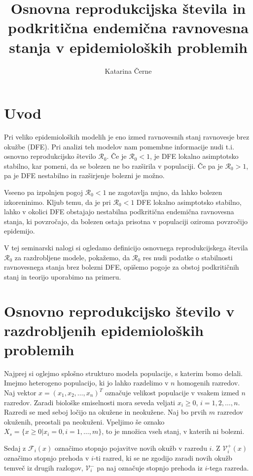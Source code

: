 \documentclass[a4paper,12pt]{article}
\newcommand{\R}{\mathcal R}
\newcommand{\F}{\mathcal F}
\newcommand{\V}{\mathcal V}
\begin{document}
\title{Osnovna reprodukcijska števila in podkritična endemična ravnovesna stanja v epidemioloških problemih}
\author{Katarina Černe}
\maketitle

\section{Uvod}

Pri veliko epidemioloških modelih je eno izmed ravnovesnih stanj ravnovesje brez okužbe (DFE). 
Pri analizi teh modelov nam pomembne informacije nudi t.i. osnovno reprodukcijsko 
število \(\R_0\). Če je \(\R_0<1\), je DFE lokalno asimptotsko stabilno, kar pomeni,
da se bolezen ne bo razširila v populaciji. Če pa je \(\R_0>1\), pa je DFE nestabilno
in razširjenje bolezni je možno.

Vseeno pa izpolnjen pogoj \(\R_0<1\) ne zagotavlja nujno, da lahko bolezen izkoreninimo.
Kljub temu, da je pri \(\R_0<1\) DFE lokalno asimptotsko stabilno, lahko v okolici
DFE obstajajo nestabilna podkritična endemična ravnovesna stanja, ki povzročajo, da 
bolezen ostaja prisotna v populaciji oziroma povzročijo epidemijo.

V tej seminarski nalogi si ogledamo definicijo osnovnega reprodukcijskega števila 
\(\R_0\) za razdrobljene modele, pokažemo, da \(\R_0\) res nudi podatke o stabilnosti
ravnovesnega stanja brez bolezni DFE, opišemo pogoje za obstoj podkritičnih stanj
in teorijo uporabimo na primeru.

\section{Osnovno reprodukcijsko število v razdrobljenih epidemioloških problemih} \label{r0}

Najprej si oglejmo splošno strukturo modela populacije, s katerim bomo delali.
Imejmo heterogeno populacijo, ki jo lahko razdelimo v \(n\) homogenih razredov.
Naj vektor \(x=(x_1,x_2,\ldots,x_n)^T\) označuje velikost populacije v vsakem 
izmed \(n\) razredov. Zaradi biološke smiselnosti mora seveda veljati \(x_i\geq 0\),
\(i=1,2,\ldots,n\). Razredi se med seboj ločijo na okužene in neokužene. 
Naj bo prvih \(m\) razredov okuženih, preostali pa neokuženi. Vpeljimo še oznako
\(X_s=\{x\geq 0 | x_i=0, i=1,\ldots, m\}\), to je množica vseh stanj, v katerih
ni bolezni.

Sedaj z \(\F_i(x)\) označimo stopnjo pojavitve novih okužb v razredu \(i\). 
Z \(\V^+_i(x)\) označimo stopnjo prehoda v \(i\)-ti razred, ki se ne zgodijo zaradi 
novih okužb temveč iz drugih razlogov, \(\V^-_i\) pa naj označuje stopnjo prehoda
iz \(i\)-tega razreda. 
\end{document}

